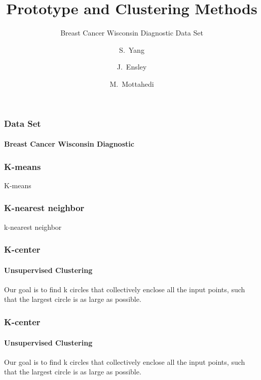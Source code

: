 \documentclass[pdf]{beamer}
\title{Prototype and Clustering Methods}
\subtitle{Breast Cancer Wisconsin Diagnostic Data Set}
\author{S.~Yang \and J.~Ensley \and M.~Mottahedi}
\begin{document}
  \frame{\titlepage}

  \begin{frame}
    \frametitle{Data Set}
    \framesubtitle{Breast Cancer Wisconsin Diagnostic}
  \end{frame}

  \begin{frame}
    \frametitle{K-means}
    K-means
  \end{frame}

  \begin{frame}
    \frametitle{K-nearest neighbor}
    k-nearest neighbor
  \end{frame}


  \begin{frame}
    \frametitle{K-center}
    \framesubtitle{Unsupervised Clustering}
    Our goal is to find k circles that collectively enclose all the input points, such that the largest circle is as large as possible.
    \end{frame}

  \begin{frame}
    \frametitle{K-center}
    \framesubtitle{Unsupervised Clustering}
    Our goal is to find k circles that collectively enclose all the input points, such that the largest circle is as large as possible.
    \end{frame}
\end{document}
